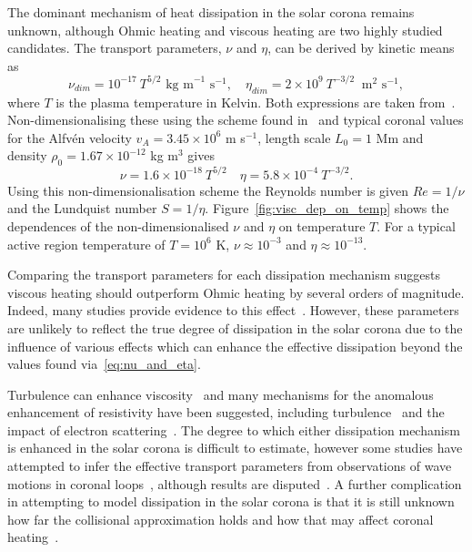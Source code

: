 The dominant mechanism of heat dissipation in the solar corona remains unknown, although Ohmic heating and viscous heating are two highly studied candidates. The transport parameters, $\nu$ and $\eta$, can be derived by kinetic means as
\begin{equation}
  \label{eq:nu_and_eta}
\nu_{dim} = 10^{-17}\ T^{5/2} \text{ kg m}^{-1}\text{ s}^{-1}, \quad \eta_{dim} = 2\times 10^{9}\ T^{-3/2}\ \text{ m}^2 \text{ s}^{-1},
\end{equation}
where $T$ is the plasma temperature in Kelvin. Both expressions are taken from~\cite{braginskiiTransportProcessesPlasma1965}. Non-dimensionalising these using the scheme found in~\cite{arberStaggeredGridLagrangian2001} and typical coronal values for the Alfv\'en velocity $v_A = 3.45 \times 10^6$ m s$^{-1}$, length scale $L_0 = 1$ Mm and density $\rho_0 = 1.67 \times 10^{-12}$ kg m$^3$ gives
\begin{equation}
  \label{eq:nondim_nu_and_eta}
\nu = 1.6 \times 10^{-18}\ T^{5/2} \quad \eta = 5.8 \times 10^{-4}\ T^{-3/2}.
\end{equation}
Using this non-dimensionalisation scheme the Reynolds number is given $Re = 1/\nu$ and the Lundquist number $S = 1/\eta$. Figure~\ref{fig:visc_dep_on_temp} shows the dependences of the non-dimensionalised $\nu$ and $\eta$ on temperature $T$. For a typical active region temperature of $T = 10^6$ K, $\nu \approx 10^{-3}$ and $\eta \approx 10^{-13}$.

Comparing the transport parameters for each dissipation mechanism suggests viscous heating should outperform Ohmic heating by several orders of magnitude. Indeed, many studies provide evidence to this effect~\cite{browningMechanismsSolarCoronal1991,craigViscousDissipation3D2013,craigAnisotropicViscousDissipation2009a,armstrongViscoResistiveDissipation2013,hollwegViscosityChewGoldbergerLowEquations1986a}. However, these parameters are unlikely to reflect the true degree of dissipation in the solar corona due to the influence of various effects which can enhance the effective dissipation beyond the values found via~\ref{eq:nu_and_eta}. 

Turbulence can enhance viscosity~\cite{canutoTurbulentViscosity1988} and many mechanisms for the anomalous enhancement of resistivity have been suggested, including turbulence~\cite{cheHowAnomalousResistivity2017} and the impact of electron scattering~\cite{maEffectiveResistivityCollisionless2018}. The degree to which either dissipation mechanism is enhanced in the solar corona is difficult to estimate, however some studies have attempted to infer the effective transport parameters from observations of wave motions in coronal loops~\cite{nakariakovTRACEObservationDamped1999}, although results are disputed~\cite{klimchukCoronalSeismologyPropagation2004}. A further complication in attempting to model dissipation in the solar corona is that it is still unknown how far the collisional approximation holds and how that may affect coronal heating~\cite{klimchukSolvingCoronalHeating2006a}.

